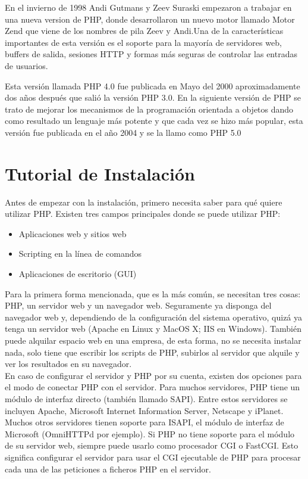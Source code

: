 \documentclass[11pt]{article} %
\begin{document}
En el invierno de 1998 Andi Gutmans y Zeev Suraski empezaron a trabajar en una nueva version de PHP, donde desarrollaron un nuevo motor llamado Motor Zend que viene de los nombres de pila Zeev y Andi.Una de la características importantes de esta versión es el soporte para la mayoría de servidores web, buffers de salida, sesiones HTTP y formas más seguras de controlar las entradas de usuarios.

Esta versión llamada PHP 4.0 fue publicada en Mayo del 2000 aproximadamente  dos años después que salió la versión PHP 3.0.
En la siguiente versión de PHP se trato de mejorar los mecanismos de la programación orientada a objetos dando como resultado un lenguaje más potente y que cada vez se hizo más popular, esta versión fue publicada en el año 2004 y se la llamo como PHP 5.0 
 

\section{Tutorial de Instalación}


Antes de empezar con la instalación, primero necesita saber para qué quiere utilizar PHP. Existen tres campos principales donde se puede utilizar PHP:

\begin {itemize}

\item Aplicaciones web y sitios web
\item Scripting en la línea de comandos
\item Aplicaciones de escritorio (GUI)
\end {itemize}

Para la primera forma mencionada, que es la más común, se necesitan tres cosas: PHP, un servidor web y un navegador web. Seguramente ya disponga del navegador web y, dependiendo de la configuración del sistema operativo, quizá ya tenga un servidor web (Apache en Linux y MacOS X; IIS en Windows). También puede alquilar espacio web en una empresa, de esta forma, no se necesita instalar nada, solo tiene que escribir los scripts de PHP, subirlos al servidor que alquile y ver los resultados en su navegador.\\

En caso de configurar el servidor y PHP por su cuenta, existen dos opciones para el modo de conectar PHP con el servidor. Para muchos servidores, PHP tiene un módulo de interfaz directo (también llamado SAPI). Entre estos servidores se incluyen Apache, Microsoft Internet Information Server, Netscape y iPlanet. Muchos otros servidores tienen soporte para ISAPI, el módulo de interfaz de Microsoft (OmniHTTPd por ejemplo). Si PHP no tiene soporte para el módulo de su servidor web, siempre puede usarlo como procesador CGI o FastCGI. Esto significa configurar el servidor para usar el CGI ejecutable de PHP para procesar cada una de las peticiones a ficheros PHP en el servidor.\\
\end{document}
